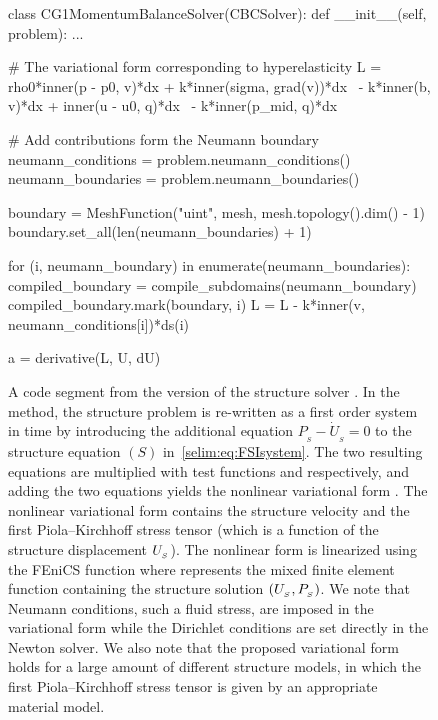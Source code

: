 \begin{figure}
\begin{python}
class CG1MomentumBalanceSolver(CBCSolver):
    def __init__(self, problem):
        ...

        # The variational form corresponding to hyperelasticity
        L = rho0*inner(p - p0, v)*dx + k*inner(sigma, grad(v))*dx \
          - k*inner(b, v)*dx + inner(u - u0, q)*dx \
          - k*inner(p_mid, q)*dx

        # Add contributions form the Neumann boundary
        neumann_conditions = problem.neumann_conditions()
        neumann_boundaries = problem.neumann_boundaries()

        boundary = MeshFunction("uint", mesh, mesh.topology().dim() - 1)
        boundary.set_all(len(neumann_boundaries) + 1)

        for (i, neumann_boundary) in enumerate(neumann_boundaries):
            compiled_boundary = compile_subdomains(neumann_boundary)
            compiled_boundary.mark(boundary, i)
            L = L - k*inner(v, neumann_conditions[i])*ds(i)

        a = derivative(L, U, dU)
\end{python}
\caption{A code segment from the \cgone{} version of the structure
  solver . In the \cgone{} method, the structure problem
  is re-written as a first order system in time by introducing the
  additional equation $P_{_{S}} - \dot{U}_{_{S}} = 0$ to the structure
  equation $(S)$ in~\eqref{selim:eq:FSIsystem}. The two resulting
  equations are multiplied with test functions \emp{v} and \emp{q}
  respectively, and adding the two equations yields the nonlinear
  variational form \emp{L}. The nonlinear variational form 
  contains the structure velocity \emp{p} and the first
  Piola--Kirchhoff stress tensor \emp{sigma} (which is a function of
  the structure displacement $U_{_{S}}$).  The nonlinear form \emp{L} is
  linearized using the FEniCS function \emp{derivative} where \emp{U}
  represents the mixed finite element function containing the structure
  solution $(U_{_{S}}, P_{_{S}})$.  We note that Neumann conditions, such a
  fluid stress, are imposed in the variational form \emp{L} while the
  Dirichlet conditions are set directly in the Newton solver. We also
  note that the proposed variational form holds for a large amount of
  different structure models, in which the first Piola--Kirchhoff stress
  tensor \emp{sigma} is given by an appropriate material model.  }
\label{selim:fig:structuresolver}
\end{figure}

